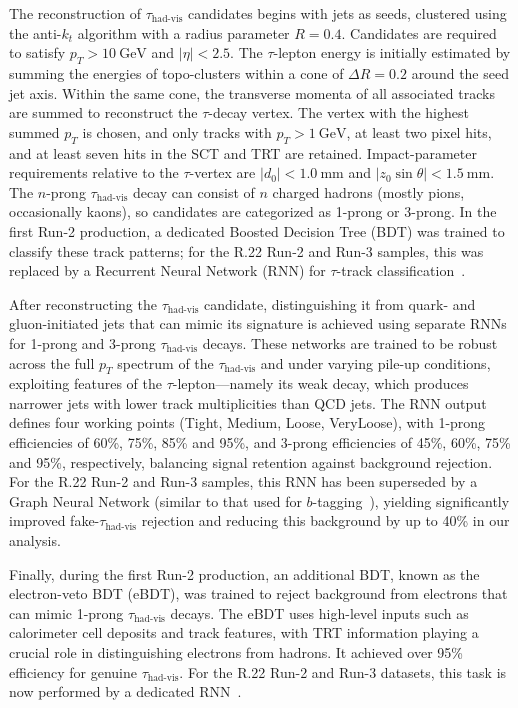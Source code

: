 The reconstruction of \(\tau_{\text{had-vis}}\) candidates begins with jets as seeds, clustered using the anti-\(k_{t}\) algorithm with a radius parameter \(R = 0.4\).  Candidates are required to satisfy \(p_{T} > 10\ \mathrm{GeV}\) and \(|\eta| < 2.5\).  The \(\tau\)-lepton energy is initially estimated by summing the energies of topo-clusters within a cone of \(\Delta R = 0.2\) around the seed jet axis.  Within the same cone, the transverse momenta of all associated tracks are summed to reconstruct the \(\tau\)-decay vertex.  
The vertex with the highest summed \(p_{T}\) is chosen, and only tracks with \(p_{T} > 1\ \mathrm{GeV}\), at least two pixel hits, and at least seven hits in the SCT and TRT are retained.  Impact-parameter requirements relative to the \(\tau\)-vertex are \(|d_{0}| < 1.0\ \mathrm{mm}\) and \(|z_{0}\sin\theta| < 1.5\ \mathrm{mm}.\)
The \(n\)-prong \(\tau_{\text{had-vis}}\) decay can consist of \(n\) charged hadrons (mostly pions, occasionally kaons), so candidates are categorized as 1-prong or 3-prong.  In the first Run-2 production, a dedicated Boosted Decision Tree (BDT) was trained to classify these track patterns; for the R.22 Run-2 and Run-3 samples, this was replaced by a Recurrent Neural Network (RNN) for \(\tau\)-track classification~\cite{ATL-PHYS-PUB-2022-044}.  

After reconstructing the \(\tau_{\text{had-vis}}\) candidate, distinguishing it from quark- and gluon-initiated jets that can mimic its signature is achieved using separate RNNs for 1-prong and 3-prong \(\tau_{\text{had-vis}}\) decays.  These networks are trained to be robust across the full \(p_{T}\) spectrum of the \(\tau_{\text{had-vis}}\) and under varying pile-up conditions, exploiting features of the \(\tau\)-lepton—namely its weak decay, which produces narrower jets with lower track multiplicities than QCD jets.  
The RNN output defines four working points (Tight, Medium, Loose, VeryLoose), with 1-prong efficiencies of 60\%, 75\%, 85\% and 95\%, and 3-prong efficiencies of 45\%, 60\%, 75\% and 95\%, respectively, balancing signal retention against background rejection.  For the R.22 Run-2 and Run-3 samples, this RNN has been superseded by a Graph Neural Network (similar to that used for \(b\)-tagging~\cite{new_tagging}), yielding significantly improved fake-\(\tau_{\text{had-vis}}\) rejection and reducing this background by up to 40\% in our analysis.  

Finally, during the first Run-2 production, an additional BDT, known as the electron-veto BDT (eBDT), was trained to reject background from electrons that can mimic 1-prong \(\tau_{\text{had-vis}}\) decays.  The eBDT uses high-level inputs such as calorimeter cell deposits and track features, with TRT information playing a crucial role in distinguishing electrons from hadrons.  It achieved over 95\% efficiency for genuine \(\tau_{\text{had-vis}}\).  For the R.22 Run-2 and Run-3 datasets, this task is now performed by a dedicated RNN~\cite{ATL-PHYS-PUB-2022-044}.

